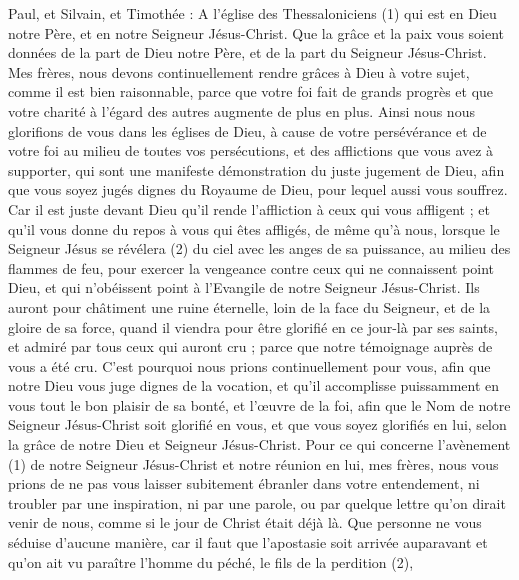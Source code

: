 \BFont
\begin{multicols}{2}
\TextTitle{[Introduction]}
\VerseOne{}Paul, et Silvain, et Timothée : A l'église des Thessaloniciens (1) qui est en Dieu notre Père, et en notre Seigneur Jésus-Christ.
Que la grâce et la paix vous soient données de la part de Dieu notre Père, et de la part du Seigneur Jésus-Christ.
Mes frères, nous devons continuellement rendre grâces à Dieu à votre sujet, comme il est bien raisonnable, parce que votre foi fait de grands progrès et que votre charité à l’égard des autres augmente de plus en plus.
Ainsi nous nous glorifions de vous dans les églises de Dieu, à cause de votre persévérance et de votre foi au milieu de toutes vos persécutions, et des afflictions que vous avez à supporter,
qui sont une manifeste démonstration du juste jugement de Dieu, afin que vous soyez jugés dignes du Royaume de Dieu, pour lequel aussi vous souffrez.
Car il est juste devant Dieu qu'il rende l'affliction à ceux qui vous affligent ;
et qu'il vous donne du repos à vous qui êtes affligés, de même qu'à nous, lorsque le Seigneur Jésus se révélera (2) du ciel avec les anges de sa puissance,
au milieu des flammes de feu, pour exercer la vengeance contre ceux qui ne connaissent point Dieu, et qui n'obéissent point à l'Evangile de notre Seigneur Jésus-Christ.
Ils auront pour châtiment une ruine éternelle, loin de la face du Seigneur, et de la gloire de sa force,
quand il viendra pour être glorifié en ce jour-là par ses saints, et admiré par tous ceux qui auront cru ; parce que notre témoignage auprès de vous a été cru.
C'est pourquoi nous prions continuellement pour vous, afin que notre Dieu vous juge dignes de la vocation, et qu'il accomplisse puissamment en vous tout le bon plaisir de sa bonté, et l’œuvre de la foi,
afin que le Nom de notre Seigneur Jésus-Christ soit glorifié en vous, et que vous soyez glorifiés en lui, selon la grâce de notre Dieu et Seigneur Jésus-Christ.
\VerseOne{}Pour ce qui concerne l'avènement (1) de notre Seigneur Jésus-Christ et notre réunion en lui, mes frères, nous vous prions
de ne pas vous laisser subitement ébranler dans votre entendement, ni troubler par une inspiration, ni par une parole, ou par quelque lettre qu’on dirait venir de nous, comme si le jour de Christ était déjà là.
Que personne ne vous séduise d’aucune manière, car il faut que l’apostasie soit arrivée auparavant et qu’on ait vu paraître l’homme du péché, le fils de la perdition (2),

\end{multicols}
